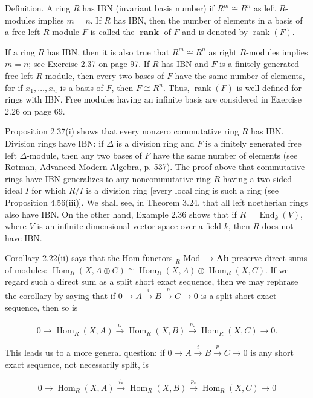 \documentclass[10pt]{article}
\begin{document}
Definition. A ring $R$ has IBN (invariant basis number) if $R^{m} \cong R^{n}$ as left $R$-modules implies $m=n$. If $R$ has IBN, then the number of elements in a basis of a free left $R$-module $F$ is called the $\boldsymbol{\operatorname { r a n k }}$ of $F$ and is denoted by $\operatorname{rank}(F)$.

If a ring $R$ has IBN, then it is also true that $R^{m} \cong R^{n}$ as right $R$-modules implies $m=n$; see Exercise 2.37 on page 97. If $R$ has IBN and $F$ is a finitely generated free left $R$-module, then every two bases of $F$ have the same number of elements, for if $x_{1}, \ldots, x_{n}$ is a basis of $F$, then $F \cong R^{n}$. Thus, $\operatorname{rank}(F)$ is well-defined for rings with IBN. Free modules having an infinite basis are considered in Exercise 2.26 on page 69.

Proposition 2.37(i) shows that every nonzero commutative ring $R$ has IBN. Division rings have IBN: if $\Delta$ is a division ring and $F$ is a finitely generated free left $\Delta$-module, then any two bases of $F$ have the same number of elements (see Rotman, Advanced Modern Algebra, p. 537). The proof above that commutative rings have IBN generalizes to any noncommutative ring $R$ having a two-sided ideal $I$ for which $R / I$ is a division ring [every local ring is such a ring (see Proposition 4.56(iii)]. We shall see, in Theorem 3.24, that all left noetherian rings also have IBN. On the other hand, Example 2.36 shows that if $R=\operatorname{End}_{k}(V)$, where $V$ is an infinite-dimensional vector space over a field $k$, then $R$ does not have IBN.

Corollary 2.22(ii) says that the Hom functors ${ }_{R}$ Mod $\rightarrow \mathbf{A b}$ preserve direct sums of modules: $\operatorname{Hom}_{R}(X, A \oplus C) \cong \operatorname{Hom}_{R}(X, A) \oplus \operatorname{Hom}_{R}(X, C)$. If we regard such a direct sum as a split short exact sequence, then we may rephrase the corollary by saying that if $0 \rightarrow A \xrightarrow{i} B \xrightarrow{p} C \rightarrow 0$ is a split short exact sequence, then so is

$$
0 \rightarrow \operatorname{Hom}_{R}(X, A) \xrightarrow{i_{*}} \operatorname{Hom}_{R}(X, B) \xrightarrow{p_{*}} \operatorname{Hom}_{R}(X, C) \rightarrow 0 .
$$

This leads us to a more general question: if $0 \rightarrow A \xrightarrow{i} B \xrightarrow{p} C \rightarrow 0$ is any short exact sequence, not necessarily split, is

$$
0 \rightarrow \operatorname{Hom}_{R}(X, A) \xrightarrow{i_{*}} \operatorname{Hom}_{R}(X, B) \xrightarrow{p_{*}} \operatorname{Hom}_{R}(X, C) \rightarrow 0
$$
\end{document}
